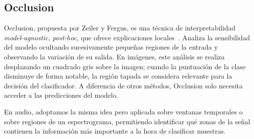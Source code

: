 \subsection{Occlusion}
\label{subsubsec:eda_occlusion}

Occlusion, propuesta por Zeiler y Fergus, es una técnica de interpretabilidad \textit{model-agnostic}, \textit{post-hoc}, que ofrece explicaciones locales~\parencite{2014occlusion}. Analiza la sensibilidad del modelo ocultando sucesivamente pequeñas regiones de la entrada y observando la variación de su salida. En imágenes, este análisis se realiza desplazando un cuadrado gris sobre la imagen; cuando la puntuación de la clase disminuye de forma notable, la región tapada se considera relevante para la decisión del clasificador. A diferencia de otros métodos, Occlusion solo necesita acceder a las predicciones del modelo.

En audio, adoptamos la misma idea pero aplicada sobre ventanas temporales o sobre regiones de un espectrograma, permitiendo identificar qué zonas de la señal contienen la información más importante a la hora de clasificar muestras.